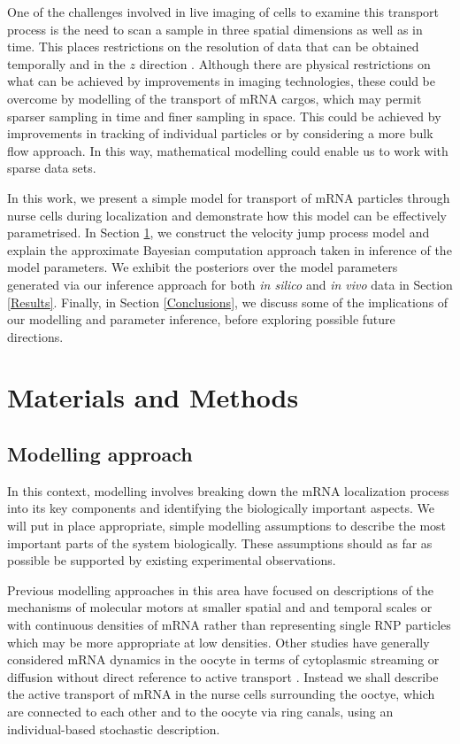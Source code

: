 \documentclass[twocolumn]{biophys}
\begin{document}
One of the challenges involved in live imaging of cells to examine this transport process is the need to scan a sample in three spatial dimensions as well as in time.
This places restrictions on the resolution of data that can be obtained temporally and in the $z$ direction \citep{weil2010making}.
Although there are physical restrictions on what can be achieved by improvements in imaging technologies, these could be overcome by modelling of the transport of mRNA cargos, which may permit sparser sampling in time and finer sampling in space.
This could be achieved by improvements in tracking of individual particles or by considering a more bulk flow approach.
In this way, mathematical modelling could enable us to work with sparse data sets.

In this work, we present a simple model for transport of mRNA particles through nurse cells during localization and demonstrate how this model can be effectively parametrised.
In Section \ref{Methods}, we construct the velocity jump process model and explain the approximate Bayesian computation approach taken in inference of the model parameters.
We exhibit the posteriors over the model parameters generated via our inference approach for both \textit{in silico} and \textit{in vivo} data in Section \ref{Results}.
Finally, in Section \ref{Conclusions}, we discuss some of the implications of our modelling and parameter inference, before exploring possible future directions.

\section{Materials and Methods} \label{Methods}
\subsection{Modelling approach}
In this context, modelling involves breaking down the mRNA localization process into its key components and identifying the biologically important aspects. 
We will put in place appropriate, simple modelling assumptions to describe the most important parts of the system biologically.
These assumptions should as far as possible be supported by existing experimental observations.

Previous modelling approaches in this area have focused on descriptions of the mechanisms of molecular motors at smaller spatial and and temporal scales \citep{bressloff2013stochastic} or with continuous densities of mRNA \citep{szymanska2014mathematical} rather than representing single RNP particles which may be more appropriate at low densities.
Other studies have generally considered mRNA dynamics in the oocyte in terms of cytoplasmic streaming or diffusion without direct reference to active transport \citep{ganguly2012cytoplasmic, liu2011role}.
Instead we shall describe the active transport of mRNA in the nurse cells surrounding the ooctye, which are connected to each other and to the oocyte via ring canals, using an individual-based stochastic description.
\end{document}
